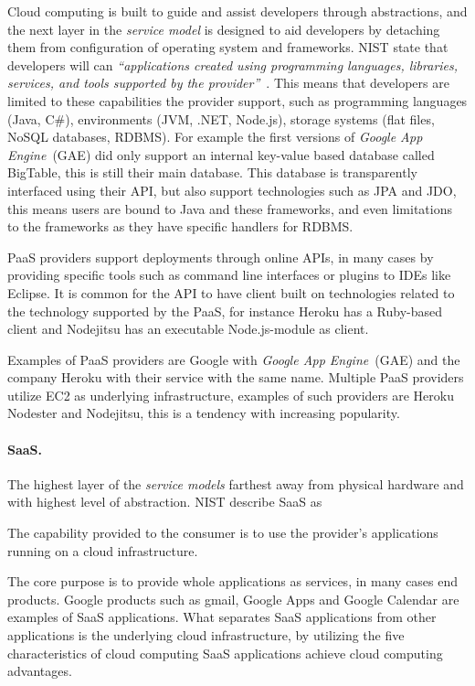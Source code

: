 Cloud computing is built to guide and assist developers through abstractions, and the next
layer in the \emph{service model} is designed to aid developers by detaching them
from configuration of operating system and frameworks.
NIST state that developers will can \emph{``applications created using programming languages, 
libraries, services, and tools supported by the provider''}~\cite{nist:mell11}.
This means that developers are limited to these capabilities the provider support,
such as programming languages (Java, C\#), environments (JVM, .NET, Node.js), 
storage systems (flat files, NoSQL databases, RDBMS).
For example the first versions of \emph{Google App Engine}~(GAE) did only support
an internal key-value based database called BigTable, this is still their main database.
This database is transparently interfaced using their API, but also support technologies such as JPA and JDO,
this means users are bound to Java and these frameworks, and even limitations to the frameworks
as they have specific handlers for RDBMS.

PaaS providers support deployments through online APIs, in many cases by providing 
specific tools such as command line interfaces or plugins to IDEs like Eclipse.
It is common for the API to have client built on technologies related to the technology supported by the PaaS,
for instance Heroku has a Ruby-based client and Nodejitsu has an executable Node.js-module as client.

Examples of PaaS providers are Google with \emph{Google App Engine}~(GAE) and
the company Heroku with their service with the same name.
Multiple PaaS providers utilize EC2 as underlying infrastructure, examples of such
providers are Heroku Nodester and Nodejitsu, this is a tendency with increasing popularity.

\paragraph{SaaS.}

The highest layer of the \emph{service models} farthest away from physical hardware
and with highest level of abstraction.
NIST describe SaaS as
\epigraph{The capability provided to the consumer is to use the provider's 
  applications running on a cloud infrastructure.
}{}

The core purpose is to provide whole applications as services, in many cases end products.
Google products such as gmail, Google Apps and  Google Calendar are examples of 
SaaS applications.
What separates SaaS applications from other applications is the underlying cloud infrastructure,
by utilizing the five characteristics of cloud computing SaaS applications achieve 
cloud computing advantages.

